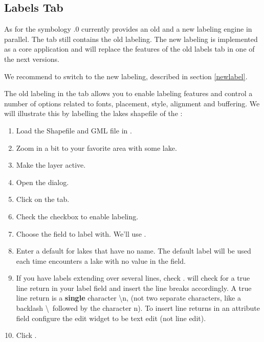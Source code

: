 \subsection{Labels Tab}\label{labeltab}

As for the symbology .0 currently provides an old and a new labeling 
engine in parallel. The  tab still contains the old labeling. The 
new labeling is implemented as a core application and will replace the features 
of the old labels tab in one of the next versions.

We recommend to switch to the new labeling, described in section \ref{newlabel}.

The old labeling in the  tab allows you to enable labeling features 
and control a number of options related to fonts, placement, style, alignment 
and buffering. We will illustrate this by labelling the lakes shapefile of the
:

\begin{enumerate}
\item Load the Shapefile  and GML file  in \qg.
\item Zoom in a bit to your favorite area with some lake.
\item Make the  layer active.
\item Open the  dialog.
\item Click on the  tab.
\item Check the  checkbox to enable labeling.
\item Choose the field to label with.
  We'll use .
\item Enter a default for lakes that have no name. The default label will be
  used each time \qg encounters a lake with no value in the 
field.
\item If you have labels extending over several lines, check . \qg will check for a true line return in your label field and
insert the line breaks accordingly. A true line return is a \textbf{single}
character \textbackslash n, (not two separate characters, like a backlash
\textbackslash ~followed by the character n).  To insert line returns in an
attribute field configure the edit widget to be text edit (not line edit).
\item Click .
\end{enumerate}

